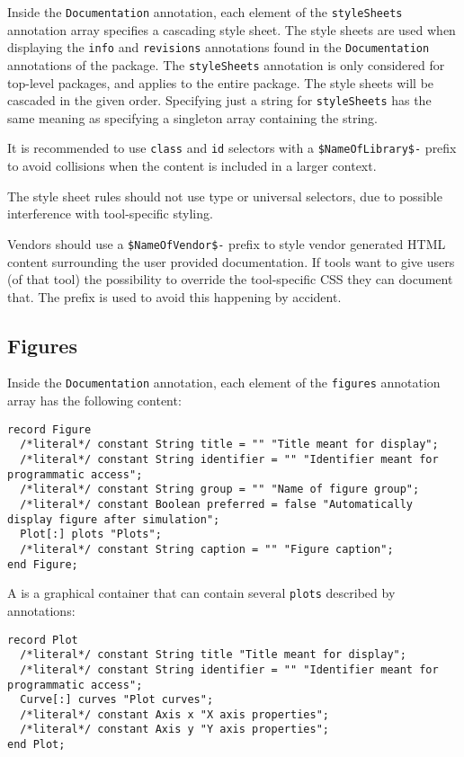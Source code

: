 Inside the \lstinline!Documentation! annotation, each element of the \lstinline!styleSheets! annotation array specifies a cascading style sheet.
The style sheets are used when displaying the \lstinline!info! and \lstinline!revisions! annotations found in the \lstinline!Documentation! annotations of the package.
The \lstinline!styleSheets! annotation is only considered for top-level packages, and applies to the entire package.
The style sheets will be cascaded in the given order.
Specifying just a string for \lstinline!styleSheets! has the same meaning as specifying a singleton array containing the string.
\begin{nonnormative}
It is recommended to use \lstinline[language=CSS]!class! and \lstinline[language=CSS]!id! selectors with a \lstinline[language=CSS]!$NameOfLibrary$-! prefix to avoid collisions when the content is included in a larger context.
\end{nonnormative}
The style sheet rules should not use type or universal selectors, due to possible interference with tool-specific styling.

Vendors should use a \lstinline[language=CSS]!$NameOfVendor$-! prefix to style vendor generated HTML content surrounding the user provided documentation.
If tools want to give users (of that tool) the possibility to override the tool-specific CSS they can document that.
The prefix is used to avoid this happening by accident.

\subsection{Figures}\label{annotations-for-figures}\label{figures}

Inside the \lstinline!Documentation! annotation, each element of the \lstinline!figures! annotation array has the following content:
\begin{lstlisting}[language=modelica]
record Figure
  /*literal*/ constant String title = "" "Title meant for display";
  /*literal*/ constant String identifier = "" "Identifier meant for programmatic access";
  /*literal*/ constant String group = "" "Name of figure group";
  /*literal*/ constant Boolean preferred = false "Automatically display figure after simulation";
  Plot[:] plots "Plots";
  /*literal*/ constant String caption = "" "Figure caption";
end Figure;
\end{lstlisting}

A  is a graphical container that can contain several \lstinline!plots! described by  annotations:
\begin{lstlisting}[language=modelica]
record Plot
  /*literal*/ constant String title "Title meant for display";
  /*literal*/ constant String identifier = "" "Identifier meant for programmatic access";
  Curve[:] curves "Plot curves";
  /*literal*/ constant Axis x "X axis properties";
  /*literal*/ constant Axis y "Y axis properties";
end Plot;
\end{lstlisting}

